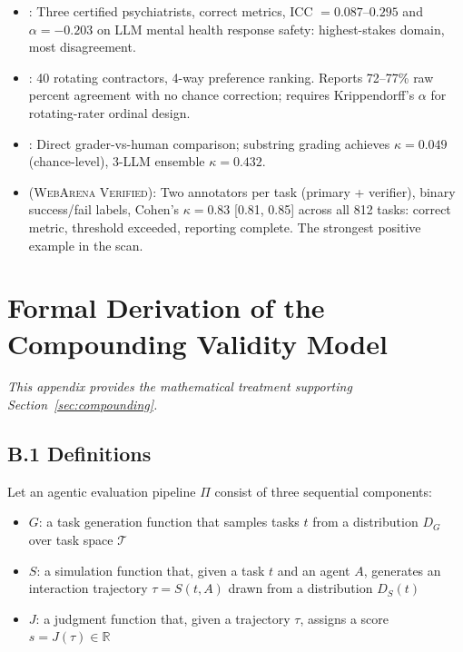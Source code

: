 \documentclass[preprint,12pt]{elsarticle}
\begin{document}
\begin{itemize}
  \item \citet{jafari2026}: Three certified psychiatrists, correct metrics, ICC
    $= 0.087$--$0.295$ and $\alpha = -0.203$ on LLM mental health response
    safety: highest-stakes domain, most disagreement.
  \item \citet{ouyang2022}: 40 rotating contractors, 4-way preference ranking.
    Reports 72--77\% raw percent agreement with no chance correction; requires
    Krippendorff's $\alpha$ for rotating-rater ordinal design.
  \item \citet{gurram2026}: Direct grader-vs-human comparison; substring grading
    achieves $\kappa = 0.049$ (chance-level), 3-LLM ensemble $\kappa = 0.432$.
  \item \citet{elhattami2025} (\textsc{WebArena Verified}): Two annotators per task
    (primary + verifier), binary success/fail labels, Cohen's $\kappa = 0.83$
    [0.81, 0.85] across all 812 tasks: correct metric, threshold exceeded, reporting
    complete. The strongest positive example in the scan.
\end{itemize}

\section{Formal Derivation of the Compounding Validity Model}
\label{app:compounding}

\textit{This appendix provides the mathematical treatment supporting
Section~\ref{sec:compounding}.}

\subsection*{B.1 Definitions}

Let an agentic evaluation pipeline $\Pi$ consist of three sequential components:
\begin{itemize}
  \item $G$: a task generation function that samples tasks $t$ from a distribution
    $D_G$ over task space $\mathcal{T}$
  \item $S$: a simulation function that, given a task $t$ and an agent $A$, generates
    an interaction trajectory $\tau = S(t, A)$ drawn from a distribution $D_S(t)$
  \item $J$: a judgment function that, given a trajectory $\tau$, assigns a score
    $s = J(\tau) \in \mathbb{R}$
\end{itemize}
\end{document}

